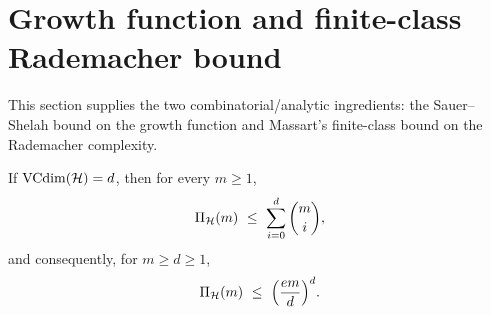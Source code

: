 \section{Growth function and finite-class Rademacher bound}\label{sec:sauer-massart}

This section supplies the two combinatorial/analytic ingredients: the
Sauer--Shelah bound on the growth function and Massart's finite-class bound on
the Rademacher complexity.

\begin{lemma}\label{lem:sauer-shelah}
If $\operatorname{VCdim}(\mathcal{H})=d$, then for every $m\ge1$,
\begin{align}\label{eq:sauer}
\Pi_{\mathcal{H}}(m)\ \le\ \sum_{i=0}^{d}\binom{m}{i},
\end{align}
and consequently, for $m\ge d\ge1$,
\begin{align}\label{eq:sauer-poly}
\Pi_{\mathcal{H}}(m)\ \le\ \Bigl(\frac{em}{d}\Bigr)^{d}.
\end{align}
\end{lemma}


